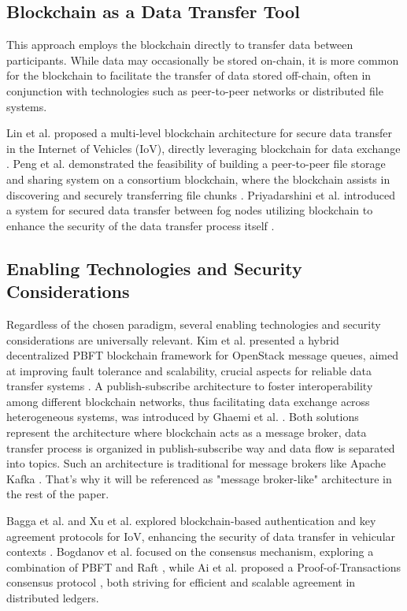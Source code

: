 \documentclass[10pt]{llncs}
\begin{document}
\subsection{Blockchain as a Data Transfer Tool}

This approach employs the blockchain directly to transfer data between participants.
While data may occasionally be stored on-chain, it is more common for the blockchain to facilitate the transfer of data stored off-chain,
 often in conjunction with technologies such as peer-to-peer networks or distributed file systems.

Lin et al. proposed a multi-level blockchain architecture for secure data transfer in the Internet of Vehicles (IoV), 
directly leveraging blockchain for data exchange \cite{Lin2023}. 
Peng et al. demonstrated the feasibility of building a peer-to-peer file storage and sharing system on a consortium blockchain, 
where the blockchain assists in discovering and securely transferring file chunks \cite{Peng2023}. 
Priyadarshini et al. introduced a system for secured data transfer between fog nodes utilizing blockchain to enhance the security of 
the data transfer process itself \cite{Priyadarshini2021}.

\subsection{Enabling Technologies and Security Considerations}

Regardless of the chosen paradigm, several enabling technologies and security considerations are universally relevant. 
Kim et al. presented a hybrid decentralized PBFT blockchain framework for OpenStack message queues, aimed at improving fault tolerance and scalability, 
crucial aspects for reliable data transfer systems \cite{kim2020hybrid}. 
A publish-subscribe architecture to foster interoperability among different blockchain networks, thus facilitating data exchange across heterogeneous systems, was introduced by Ghaemi et al. \cite{Ghaemi2021}. 
Both solutions represent the architecture where blockchain acts as a message broker, data transfer process is organized in publish-subscribe way and data flow is separated into topics. 
Such an architecture is traditional for message brokers like Apache Kafka \cite{apachekafka}.
That's why it will be referenced as "message broker-like" architecture in the rest of the paper.

Bagga et al. and Xu et al. explored blockchain-based authentication and key agreement protocols for IoV, enhancing the security of data transfer in vehicular contexts \cite{Bagga2021,Xu2021}. 
Bogdanov et al. focused on the consensus mechanism, exploring a combination of PBFT and Raft \cite{Bogdanov2024}, while Ai et al. proposed a Proof-of-Transactions consensus protocol \cite{Ai2022}, 
both striving for efficient and scalable agreement in distributed ledgers. 
\end{document}
